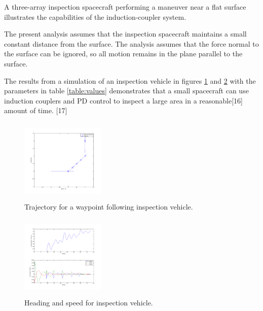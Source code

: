 A three-array inspection spacecraft performing a maneuver near a flat surface illustrates the capabilities of the induction-coupler system. 

The present analysis assumes that the inspection spacecraft maintains a small constant distance from the surface. The analysis assumes that the force normal to the surface can be ignored, so all motion remains in the plane parallel to the surface. 

The results from a simulation of an inspection vehicle in figures \ref{fig:trajectory} and \ref{fig:theta_and_speeds} with the parameters in table \ref{table:values} demonstrates that a small spacecraft can use induction couplers and PD control to inspect a large area in a 
reasonable[16] amount of time. [17]

\begin{figure}

\includegraphics[width = 4cm, height = 4cm ]{figures/planar_trajectory.png}
\caption{Trajectory for a waypoint following inspection vehicle.}
\label{fig:trajectory}
\end{figure}

\begin{figure}

\includegraphics[width = 4cm, height = 4cm ]{figures/theta_and_speed.png}
\caption{Heading and speed for inspection vehicle.}
\label{fig:theta_and_speeds}
\end{figure}



